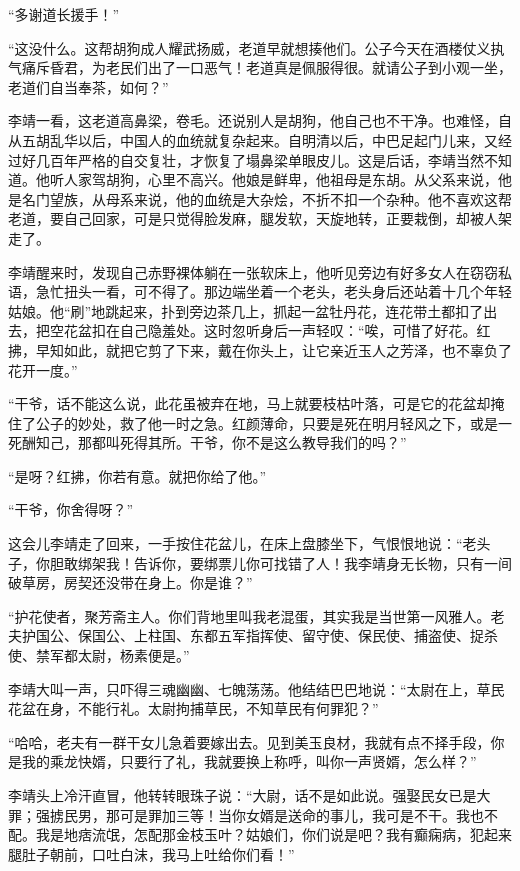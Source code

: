 “多谢道长援手！”

“这没什么。这帮胡狗成人耀武扬威，老道早就想揍他们。公子今天在酒楼仗义执气痛斥昏君，为老民们出了一口恶气！老道真是佩服得很。就请公子到小观一坐，老道们自当奉茶，如何？”

李靖一看，这老道高鼻梁，卷毛。还说别人是胡狗，他自己也不干净。也难怪，自从五胡乱华以后，中国人的血统就复杂起来。自明清以后，中巴足起门儿来，又经过好几百年严格的自交复壮，才恢复了塌鼻梁单眼皮儿。这是后话，李靖当然不知道。他听人家驾胡狗，心里不高兴。他娘是鲜卑，他祖母是东胡。从父系来说，他是名门望族，从母系来说，他的血统是大杂烩，不折不扣一个杂种。他不喜欢这帮老道，要自己回家，可是只觉得脸发麻，腿发软，天旋地转，正要栽倒，却被人架走了。

李靖醒来时，发现自己赤野裸体躺在一张软床上，他听见旁边有好多女人在窃窃私语，急忙扭头一看，可不得了。那边端坐着一个老头，老头身后还站着十几个年轻姑娘。他“刷”地跳起来，扑到旁边茶几上，抓起一盆牡丹花，连花带土都扣了出去，把空花盆扣在自己隐羞处。这时忽听身后一声轻叹：“唉，可惜了好花。红拂，早知如此，就把它剪了下来，戴在你头上，让它亲近玉人之芳泽，也不辜负了花开一度。”

“干爷，话不能这么说，此花虽被弃在地，马上就要枝枯叶落，可是它的花盆却掩住了公子的妙处，救了他一时之急。红颜薄命，只要是死在明月轻风之下，或是一死酬知己，那都叫死得其所。干爷，你不是这么教导我们的吗？”

“是呀？红拂，你若有意。就把你给了他。”

“干爷，你舍得呀？”

这会儿李靖走了回来，一手按住花盆儿，在床上盘膝坐下，气恨恨地说：“老头子，你胆敢绑架我！告诉你，要绑票儿你可找错了人！我李靖身无长物，只有一间破草房，房契还没带在身上。你是谁？”

“护花使者，聚芳斋主人。你们背地里叫我老混蛋，其实我是当世第一风雅人。老夫护国公、保国公、上柱国、东都五军指挥使、留守使、保民使、捕盗使、捉杀使、禁军都太尉，杨素便是。”

李靖大叫一声，只吓得三魂幽幽、七魄荡荡。他结结巴巴地说：“太尉在上，草民花盆在身，不能行礼。太尉拘捕草民，不知草民有何罪犯？”

“哈哈，老夫有一群干女儿急着要嫁出去。见到美玉良材，我就有点不择手段，你是我的乘龙快婿，只要行了礼，我就要换上称呼，叫你一声贤婿，怎么样？”

李靖头上冷汗直冒，他转转眼珠子说：“大尉，话不是如此说。强娶民女已是大罪；强掳民男，那可是罪加三等！当你女婿是送命的事儿，我可是不干。我也不配。我是地痞流氓，怎配那金枝玉叶？姑娘们，你们说是吧？我有癫痫病，犯起来腿肚子朝前，口吐白沫，我马上吐给你们看！”

